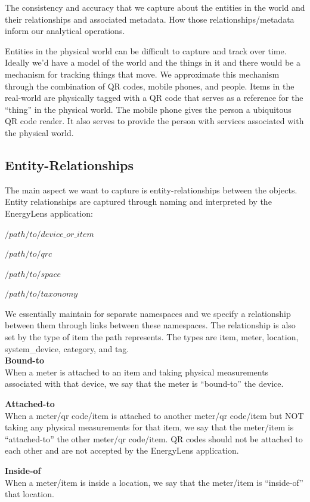 The consistency and accuracy that we capture about the entities in the world and their relationships and associated metadata.
How those relationships/metadata inform our analytical operations.

Entities in the physical world can be difficult to capture and track over time.  Ideally we’d have a model of the world and the things in it and there would be a mechanism for tracking things that move.  We approximate this mechanism through the combination of QR codes, mobile phones, and people.  Items in the real-world are physically tagged with a QR code that serves as a reference for the “thing” in the physical world.  The mobile phone gives the person a ubiquitous QR code reader.  It also serves to provide the person with services associated with the physical world.

\subsection{Entity-Relationships}
The main aspect we want to capture is entity-relationships between the objects.  Entity relationships are captured through naming and interpreted by the EnergyLens application:

$/path/to/device\_or\_item$

$/path/to/qrc$

$/path/to/space$

$/path/to/taxonomy$

We essentially maintain for separate namespaces and we specify a relationship between them through links between these namespaces.  The relationship is also set by the type of item the path represents.  The types are item, meter, location, system\_device, category, and tag.\\

{\bf Bound-to}\\
When a meter is attached to an item and taking physical measurements associated with that device, we say that the meter is “bound-to” the device.

{\bf Attached-to}\\
When a meter/qr code/item is attached to another meter/qr code/item but NOT taking any physical measurements for that item, we say that the meter/item is “attached-to” the other meter/qr code/item.  QR codes should not be attached to each other and are not accepted by the EnergyLens application.

{\bf Inside-of}\\
When a meter/item is inside a location, we say that the meter/item is “inside-of” that location.

